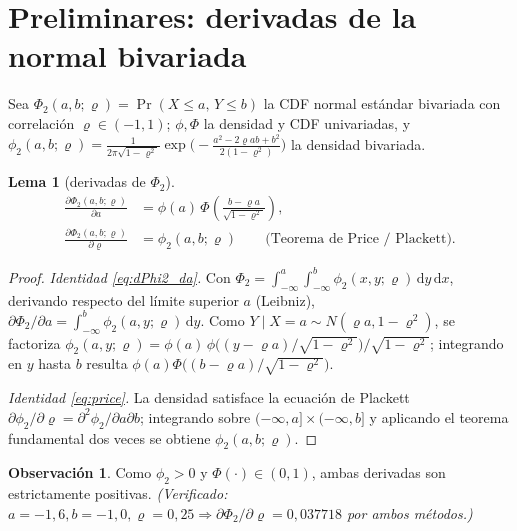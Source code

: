 \documentclass[11pt]{article}
\theoremstyle{plain}
\newtheorem{lemma}{Lema}
\theoremstyle{definition}
\newtheorem{remark}{Observación}
\newcommand{\1}{\mathbf{1}}
\newcommand{\dd}{\,\mathrm{d}}
\begin{document}
\tableofcontents
\bigskip

\section{Preliminares: derivadas de la normal bivariada}\label{sec:prelim}

Sea $\Phi_2(a,b;\varrho)=\Pr(X\le a,\,Y\le b)$ la CDF normal estándar bivariada con correlación $\varrho\in(-1,1)$; $\phi,\Phi$ la densidad y CDF univariadas, y $\phi_2(a,b;\varrho)=\frac{1}{2\pi\sqrt{1-\varrho^2}}\exp\!\big(-\frac{a^2-2\varrho ab+b^2}{2(1-\varrho^2)}\big)$ la densidad bivariada.

\begin{lemma}[derivadas de $\Phi_2$]\label{lem:phi2}
\begin{align}
\frac{\partial \Phi_2(a,b;\varrho)}{\partial a} &= \phi(a)\,\Phi\!\left(\frac{b-\varrho a}{\sqrt{1-\varrho^2}}\right), \label{eq:dPhi2_da}\\[4pt]
\frac{\partial \Phi_2(a,b;\varrho)}{\partial \varrho} &= \phi_2(a,b;\varrho) \qquad\text{(Teorema de Price / Plackett).}\label{eq:price}
\end{align}
\end{lemma}

\begin{proof}
\emph{Identidad \eqref{eq:dPhi2_da}.} Con $\Phi_2=\int_{-\infty}^{a}\!\int_{-\infty}^{b}\phi_2(x,y;\varrho)\dd y\dd x$, derivando respecto del límite superior $a$ (Leibniz), $\partial\Phi_2/\partial a=\int_{-\infty}^{b}\phi_2(a,y;\varrho)\dd y$. Como $Y\mid X=a\sim N(\varrho a,1-\varrho^2)$, se factoriza $\phi_2(a,y;\varrho)=\phi(a)\,\phi\!\big((y-\varrho a)/\sqrt{1-\varrho^2}\big)/\sqrt{1-\varrho^2}$; integrando en $y$ hasta $b$ resulta $\phi(a)\Phi\!\big((b-\varrho a)/\sqrt{1-\varrho^2}\big)$.

\emph{Identidad \eqref{eq:price}.} La densidad satisface la ecuación de Plackett $\partial\phi_2/\partial\varrho=\partial^2\phi_2/\partial a\partial b$; integrando sobre $(-\infty,a]\times(-\infty,b]$ y aplicando el teorema fundamental dos veces se obtiene $\phi_2(a,b;\varrho)$.
\end{proof}

\begin{remark}
Como $\phi_2>0$ y $\Phi(\cdot)\in(0,1)$, ambas derivadas son estrictamente positivas. \emph{(Verificado: $a=-1{,}6,b=-1{,}0,\varrho=0{,}25\Rightarrow\partial\Phi_2/\partial\varrho=0{,}037718$ por ambos métodos.)}
\end{remark}
\end{document}
